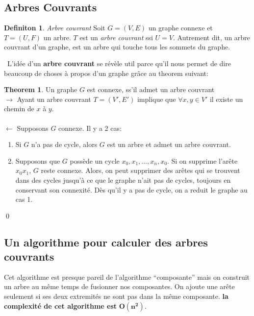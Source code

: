 \documentclass[french]{article}
\theoremstyle{definition}
\newtheorem{definition}{Definiton}[subsection]
\newtheorem{theorem}{Theorem}[section]
\begin{document}
		\subsection{Arbres Couvrants}
		\begin{definition}{\textit{Arbre couvrant}}
			Soit $G = (V, E)$ un graphe connexe et $T = (U, F)$ un arbre. $T$ est un \textit{arbre couvrant} ssi $U = V$. Autrement dit, un arbre couvrant d'un graphe, est un arbre qui touche tous les sommets du graphe.
		\end{definition}
		\
		L'idée d'un \textbf{arbre couvrant} se révèle util parce qu'il nous permet de dire beaucoup de choses à propos d'un graphe grâce au theorem suivant:
		\\
		\begin{theorem}{Un graphe $G$ est connexe, ss'il admet un arbre couvrant}\\
			$\to$ Ayant un arbre couvrant $T = (V', E')$ implique que $\forall x,y \in V'$ il existe un chemin de $x$ à $y$. \\ \\
			$\leftarrow$ Supposons $G$ connexe. Il y a 2 cas: \\
			\begin{enumerate}
				\item Si $G$ n'a pas de cycle, alors $G$ est un arbre et admet un arbre couvrant.
				\item Supposons que $G$ possède un cycle $x_0, x_1, \dots,x_n,x_0$. Si on supprime l'arête $x_0x_1$, $G$ reste connexe.
				Alors, on peut supprimer des arêtes qui se trouvent dans des cycles jusqu'à ce que le graphe n'ait pas de cycles, toujours en conservant son connexité. Dès qu'il y a pas de cycle, on a reduit le graphe au cas 1.
			\end{enumerate}
		\end{theorem}
		\qed

		\subsection{Un algorithme pour calculer des arbres couvrants}
		Cet algorithme est presque pareil de l'algorithme ``composante'' mais on construit un arbre au même temps de fusionner nos composantes. On ajoute une arête seulement si ses deux extremités ne sont pas dans la même composante. \textbf{la complexité de cet algorithme est} $\mathbf{O(n^2)}$.

		\begin{algorithmic}[1]
			\ENDFOR
					\ENDIF
				\ENDFOR
				\ENDIF
			\ENDFOR
		\end{algorithmic}
\end{document}

